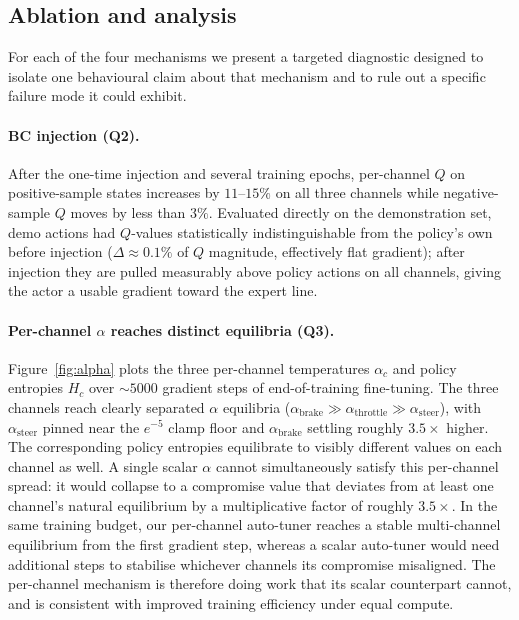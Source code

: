 \documentclass{article}
\begin{document}
\subsection{Ablation and analysis}
\label{sec:ablation}

For each of the four mechanisms we present a targeted diagnostic
designed to isolate one behavioural claim about that mechanism and
to rule out a specific failure mode it could exhibit.

\paragraph{BC injection (Q2).}
After the one-time injection and several training epochs, per-channel
$Q$ on positive-sample states increases by $11$--$15\%$ on all three
channels while negative-sample $Q$ moves by less than $3\%$.
Evaluated directly on the demonstration set, demo actions had
$Q$-values statistically indistinguishable from the policy's own
before injection ($\Delta \approx 0.1\%$ of $Q$ magnitude, effectively
flat gradient); after injection they are pulled measurably above
policy actions on all channels, giving the actor a usable gradient
toward the expert line.

\paragraph{Per-channel $\alpha$ reaches distinct equilibria (Q3).}
Figure~\ref{fig:alpha} plots the three per-channel temperatures
$\alpha_c$ and policy entropies $H_c$ over $\sim\!5000$ gradient
steps of end-of-training fine-tuning. The three channels reach
clearly separated $\alpha$ equilibria
($\alpha_\mathrm{brake} \gg \alpha_\mathrm{throttle} \gg \alpha_\mathrm{steer}$),
with $\alpha_\mathrm{steer}$ pinned near the $e^{-5}$ clamp floor and
$\alpha_\mathrm{brake}$ settling roughly $3.5\times$ higher. The
corresponding policy entropies equilibrate to visibly different
values on each channel as well. A single scalar $\alpha$ cannot
simultaneously satisfy this per-channel spread: it would collapse to
a compromise value that deviates from at least one channel's natural
equilibrium by a multiplicative factor of roughly $3.5\times$. In
the same training budget, our per-channel auto-tuner reaches a
stable multi-channel equilibrium from the first gradient step,
whereas a scalar auto-tuner would need additional steps to stabilise
whichever channels its compromise misaligned. The per-channel
mechanism is therefore doing work that its scalar counterpart
cannot, and is consistent with improved training efficiency under
equal compute.
\end{document}
